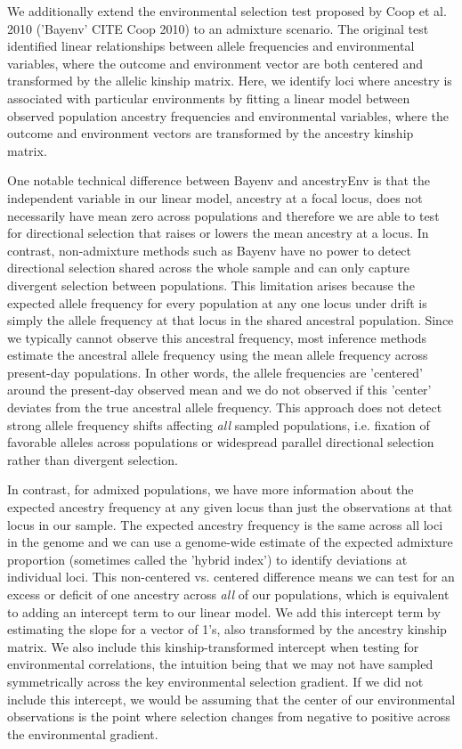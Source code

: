\documentclass[12pt]{report}
\begin{document}
We additionally extend the environmental selection test proposed by Coop et al. 2010 ('Bayenv' CITE Coop 2010) to an admixture scenario. The original test identified linear relationships between allele frequencies and environmental variables, where the outcome and environment vector are both centered and transformed by the allelic kinship matrix. Here, we identify loci where ancestry is associated with particular environments by fitting a linear model between observed population ancestry frequencies and environmental variables, where the outcome and environment vectors are transformed by the ancestry kinship matrix.
 
One notable technical difference between Bayenv and ancestryEnv is that the independent variable in our linear model, ancestry at a focal locus, does not necessarily have mean zero across populations and therefore we are able to test for directional selection that raises or lowers the mean ancestry at a locus. In contrast, non-admixture methods such as Bayenv have no power to detect directional selection shared across the whole sample and can only capture divergent selection between populations. This limitation arises because the expected allele frequency for every population at any one locus under drift is simply the allele frequency at that locus in the shared ancestral population. Since we typically cannot observe this ancestral frequency, most inference methods estimate the ancestral allele frequency using the mean allele frequency across present-day populations. In other words, the allele frequencies are 'centered' around the present-day observed mean and we do not observed if this 'center' deviates from the true ancestral allele frequency. This approach does not detect strong allele frequency shifts affecting \textit{all} sampled populations, i.e. fixation of favorable alleles across populations or widespread parallel directional selection rather than divergent selection.

In contrast, for admixed populations, we have more information about the expected ancestry frequency at any given locus than just the observations at that locus in our sample. The expected ancestry frequency is the same across all loci in the genome and we can use a genome-wide estimate of the expected admixture proportion (sometimes called the 'hybrid index') to identify deviations at individual loci. This non-centered vs. centered difference means we can test for an excess or deficit of one ancestry across \textit{all} of our populations, which is equivalent to adding an intercept term to our linear model. We add this intercept term by estimating the slope for a vector of 1's, also transformed by the ancestry kinship matrix. We also include this kinship-transformed intercept when testing for environmental correlations, the intuition being that we may not have sampled symmetrically across the key environmental selection gradient. If we did not include this intercept, we would be assuming that the center of our environmental observations is the point where selection changes from negative to positive across the environmental gradient.
\end{document}
